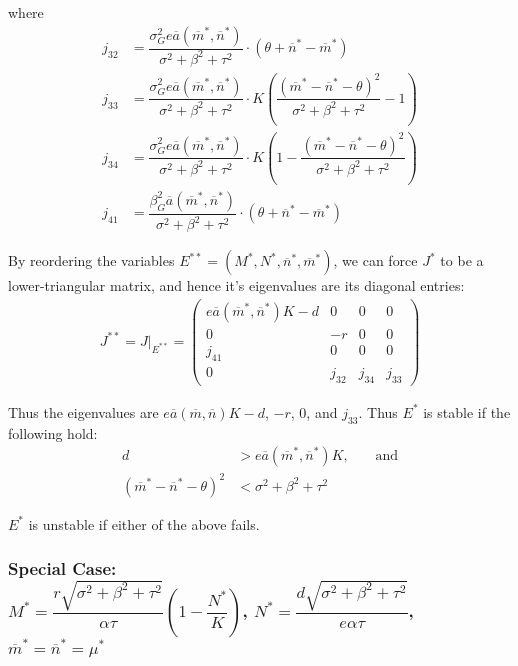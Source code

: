 \documentclass[12pt]{article}
\begin{document}
\noindent where
\begin{align*}
	j_{32} &= \dfrac{\sigma_G^2e\overline{a}(\overline{m}^*, \overline{n}^*)}{\sigma^2 + \beta^2 + \tau^2} \cdot (\theta + \overline{n}^* - \overline{m}^*) \\
	j_{33} &=  \dfrac{\sigma_G^2e\overline{a}(\overline{m}^*, \overline{n}^*)}{\sigma^2 + \beta^2 + \tau^2} \cdot K\left(\dfrac{(\overline{m}^* - \overline{n}^* - \theta)^2}{\sigma^2 + \beta^2 + \tau^2} - 1\right) \\
	j_{34} &= \dfrac{\sigma_G^2e\overline{a}(\overline{m}^*, \overline{n}^*)}{\sigma^2 + \beta^2 + \tau^2} \cdot K\left(1 - \dfrac{(\overline{m}^* - \overline{n}^* - \theta)^2}{\sigma^2 + \beta^2 + \tau^2}\right) \\
	j_{41} &= \dfrac{\beta_G^2\overline{a}(\overline{m}^*, \overline{n}^*)}{\sigma^2 + \beta^2 + \tau^2} \cdot (\theta + \overline{n}^* - \overline{m}^*)
\end{align*}

\vskip 10pt

\noindent By reordering the variables $E^{**} = (M^*, N^*, \overline{n}^*, \overline{m}^*)$, we can force $J^*$ to be a lower-triangular matrix, and hence it's eigenvalues are its diagonal entries:
\begin{align*}
	J^{**} = J\big|_{E^{**}} = \left(
	\begin{array}{cccc}
		e\overline{a}(\overline{m}^*, \overline{n}^*)K - d & 0 & 0 & 0 \\[.4cm]
		0 & -r & 0 & 0 \\[.4cm]
		j_{41} & 0 & 0 & 0 \\[.4cm]
		0 & j_{32} & j_{34} & j_{33}
	\end{array}
	\right)
\end{align*}

\vskip 10pt

\noindent Thus the eigenvalues are $e\overline{a}(\overline{m}, \overline{n})K - d$, $-r$, $0$, and $j_{33}$.  Thus $E^*$ is stable if the following hold:
\begin{align*}
	d &> e\overline{a}(\overline{m}^*, \overline{n}^*)K \text{,}\qquad\text{and} \\[.1cm]
	(\overline{m}^* - \overline{n}^* - \theta)^2 &< \sigma^2 + \beta^2 + \tau^2
\end{align*}

\noindent $E^*$ is unstable if either of the above fails.

\vskip 20pt
							\subsubsection{Special Case: \\ $M^* = \dfrac{r\sqrt{\sigma^2 + \beta^2 + \tau^2}}{\alpha \tau}\left(1 - \dfrac{N^*}{K}\right)$, $N^* = \dfrac{d\sqrt{\sigma^2 + \beta^2 + \tau^2}}{e \alpha \tau}$, $\overline{m}^* = \overline{n}^* = \mu^*$}
\end{document}
